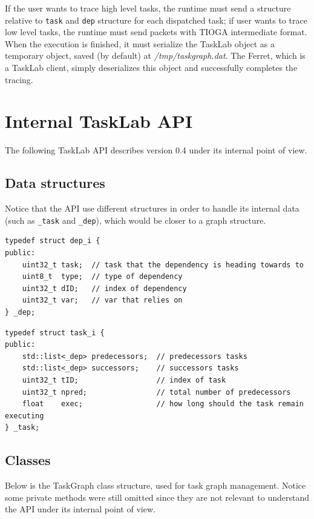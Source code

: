 If the user wants to trace high level tasks, the runtime must send a structure relative to \texttt{task} and \texttt{dep} structure for each dispatched task; if user wants to trace low level tasks, the runtime must send packets with TIOGA \cite{TIOGA} intermediate format. When the execution is finished, it must serialize the TaskLab object as a temporary object, saved (by default) at \textit{/tmp/taskgraph.dat}. The Ferret, which is a TaskLab client, simply deserializes this object and successfully completes the tracing.

\section{Internal TaskLab API}
The following TaskLab API describes version 0.4 under its internal point of view.

\subsection{Data structures}
Notice that the API use different structures in order to handle its internal data (such as \texttt{\_task} and \texttt{\_dep}), which would be closer to a graph structure.

\begin{verbatim}
typedef struct dep_i {
public:
    uint32_t task;  // task that the dependency is heading towards to
    uint8_t  type;  // type of dependency
    uint32_t dID;   // index of dependency
    uint32_t var;   // var that relies on
} _dep;
\end{verbatim}

\begin{verbatim}
typedef struct task_i {
public:
    std::list<_dep> predecessors;  // predecessors tasks
    std::list<_dep> successors;    // successors tasks
    uint32_t tID;                  // index of task
    uint32_t npred;                // total number of predecessors
    float    exec;                 // how long should the task remain executing
} _task;
\end{verbatim}

\subsection{Classes}
Below is the TaskGraph class structure, used for task graph management. Notice some private methods were still omitted since they are not relevant to understand the API under its internal point of view.

